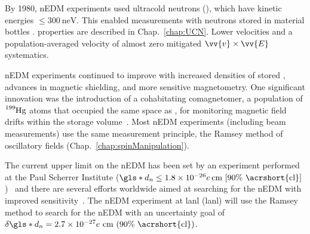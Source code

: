 By 1980, nEDM experiments \cite{altarev_nedm_1980, altarev_nedm_1981} used ultracold neutrons (\ucn), which have kinetic energies $\leq \qty{300}{\nano\eV}$. This enabled measurements with neutrons stored in material bottles \cite{smith_nedm_1990}. \ucn properties are described in Chap.~\ref{chap:UCN}. Lower \ucn velocities and a population-averaged velocity of almost zero mitigated $\vv{v}\times\vv{E}$ systematics. 

nEDM experiments continued to improve with increased densities of stored \ucn, advances in magnetic shielding, and more sensitive magnetometry. One significant innovation was the introduction of a cohabitating comagnetomer, a population of $\ce{^{199}Hg}$ atoms that occupied the same space as \ucn, for monitoring magnetic field drifts within the storage volume~\cite{BAK06}. Most nEDM experiments (including beam measurements) use the same measurement principle, the Ramsey method of oscillatory fields \cite{ramsey_molecular_1950} (Chap.~\ref{chap:spinManipulation}). 

The current upper limit on the nEDM has been set by an experiment performed at the Paul Scherrer Institute ($\gls*{d_n}\leq 1.8\times10^{-26}e\,\text{cm [90\% \acrshort{cl}]}$)~\cite{ABE20} and there are several efforts worldwide aimed at searching for the nEDM with improved sensitivity~\cite{Alarcon2022}. The nEDM experiment at \acrlong*{lanl} (\acrshort*{lanl}) will use the Ramsey method to search for the nEDM with an uncertainty goal of $\delta \gls*{d_n} = 2.7\times10^{-27}e\text{ cm (90\% \acrshort{cl})}$.

